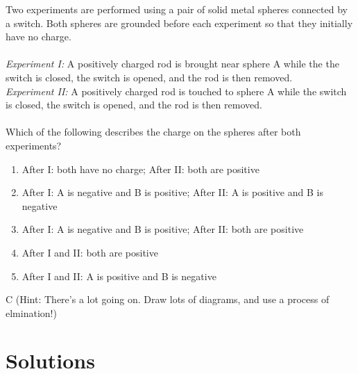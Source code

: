 \newpage
\begin{question}
Two experiments are performed using a pair of solid metal spheres connected by a switch. Both spheres are grounded before each experiment so that they initially have no charge.
\\\\
\emph{Experiment I:} A positively charged rod is brought near sphere A while the the switch is closed, the switch is opened, and the rod is then removed.
\\
\emph{Experiment II:} A positively charged rod is touched to sphere A while the switch is closed, the switch is opened, and the rod is then removed.
\\\\
Which of the following describes the charge on the spheres after both experiments?
\begin{enumerate}[label=(\alph*)]
    \item After I: both have no charge; After II: both are positive
    \item After I: A is negative and B is positive; After II: A is positive and B is negative
    \item After I: A is negative and B is positive; After II: both are positive
    \item After I and II: both are positive
    \item After I and II: A is positive and B is negative
\end{enumerate}

\end{question}

\begin{solution}
C (Hint: There's a lot going on. Draw lots of diagrams, and use a process of elmination!)
\end{solution}


\newpage
\section{Solutions}


\printsolutions